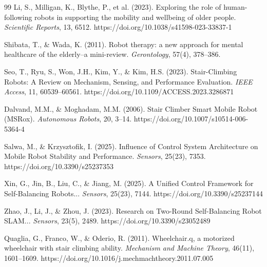 \documentclass[12pt,a4paper]{article}
\begin{document}
\begin{thebibliography}{99}
Li, S., Milligan, K., Blythe, P., et al. (2023). Exploring the role of human-following robots in supporting the mobility and wellbeing of older people. \textit{Scientific Reports}, 13, 6512. https://doi.org/10.1038/s41598-023-33837-1

Shibata, T., \& Wada, K. (2011). Robot therapy: a new approach for mental healthcare of the elderly--a mini-review. \textit{Gerontology}, 57(4), 378--386.

Seo, T., Ryu, S., Won, J.H., Kim, Y., \& Kim, H.S. (2023). Stair-Climbing Robots: A Review on Mechanism, Sensing, and Performance Evaluation. \textit{IEEE Access}, 11, 60539--60561. https://doi.org/10.1109/ACCESS.2023.3286871

Dalvand, M.M., \& Moghadam, M.M. (2006). Stair Climber Smart Mobile Robot (MSRox). \textit{Autonomous Robots}, 20, 3--14. https://doi.org/10.1007/s10514-006-5364-4

Salwa, M., \& Krzysztofik, I. (2025). Influence of Control System Architecture on Mobile Robot Stability and Performance. \textit{Sensors}, 25(23), 7353. https://doi.org/10.3390/s25237353

Xin, G., Jin, B., Liu, C., \& Jiang, M. (2025). A Unified Control Framework for Self-Balancing Robots... \textit{Sensors}, 25(23), 7144. https://doi.org/10.3390/s25237144

Zhao, J., Li, J., \& Zhou, J. (2023). Research on Two-Round Self-Balancing Robot SLAM... \textit{Sensors}, 23(5), 2489. https://doi.org/10.3390/s23052489

Quaglia, G., Franco, W., \& Oderio, R. (2011). Wheelchair.q, a motorized wheelchair with stair climbing ability. \textit{Mechanism and Machine Theory}, 46(11), 1601--1609. https://doi.org/10.1016/j.mechmachtheory.2011.07.005

\end{thebibliography}
\end{document}
